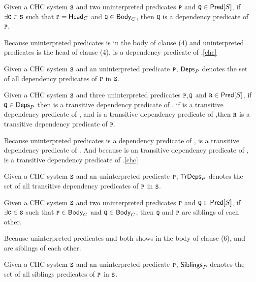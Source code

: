 \begin{defn}
  Given a CHC system $\cc{S}$ and two uninterpreted predicates $\cc{P}$ and
  $\cc{Q} \in \predof{S}$, if $\exists \cc{C} \in \cc{S}$ such that $\cc{P} = \headof{C}$
  and $\cc{Q} \in \bodyof{C}$, then $\cc{Q}$ is a dependency predicate of $\cc{P}$.
\end{defn}
%
\begin{ex}
  Because uninterpreted predicates  is in the body of clause (4) and uninterpreted predicates 
  is the head of clause (4),  is a dependency predicate of .\autoref{chc}
\end{ex}
%
Given a CHC system $\cc{S}$ and an uninterpreted predicate $\cc{P}$, $\mathsf{Deps}_{P}$
denotes the set of all dependency predicates of $\cc{P}$ in $\cc{S}$.
%

\begin{defn}
  Given a CHC system $\cc{S}$ and three uninterpreted predicates $\cc{P},
  \cc{Q}$ and $\cc{R} \in \predof{S}$, if $\cc{Q} \in \depsof{P}$ then  is a transitive dependency
  predicate of . 
  if  is a transitive dependency predicate of , and  is a transitive dependency predicate
  of ,then $\cc{R}$ is a transitive dependency predicate of $\cc{P}$.
\end{defn}
%
\begin{ex}
  Because uninterpreted predicates  is a dependency predicate of , 
   is a transitive dependency predicate of .
  And because  is an transitive dependency predicate of , 
   is a transitive dependency predicate of .\autoref{chc}
\end{ex}
%
Given a CHC system $\cc{S}$ and an uninterpreted predicate $\cc{P}$, $\mathsf{TrDeps}_{P}$
denotes the set of all transitive dependency predicates of $\cc{P}$ in $\cc{S}$.
%

\begin{defn}
  Given a CHC system $\cc{S}$ and two uninterpreted predicates $\cc{P}$ and
  $\cc{Q} \in \predof{S}$, if $\exists \cc{C} \in \cc{S}$ such that $\cc{P} \in \bodyof{C}$
  and $\cc{Q} \in \bodyof{C}$, then $\cc{Q}$ and $\cc{P}$ are siblings of each other.
\end{defn}
%
\begin{ex}
  Because uninterpreted predicates  and  both shows in the body of
  clause (6),  and  are siblings of each other.
\end{ex}
%
Given a CHC system $\cc{S}$ and an uninterpreted predicate $\cc{P}$, $\mathsf{Siblings}_{P}$
denotes the set of all siblings predicates of $\cc{P}$ in $\cc{S}$.
%

